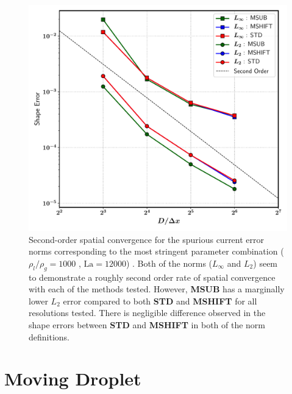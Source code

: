 \begin{figure}[h!]
    \centering
    \includegraphics[width = 1.0\textwidth]{plots/static_drop/convergence.pdf}
	\caption{Second-order spatial convergence for the spurious current error norms corresponding to the most stringent parameter combination ($\rho_l/\rho_g = 1000$ , $\textrm{La} = 12000$) . Both of the norms ($L_\infty$ and $L_2$) seem to demonstrate a roughly second order rate of spatial convergence with each of the methods tested. However, \textbf{MSUB} has a marginally lower $L_2$ error compared to both \textbf{STD} and \textbf{MSHIFT} for all resolutions tested. There is negligible difference observed in the shape errors between \textbf{STD} and \textbf{MSHIFT} in both of the norm definitions.}   
    \label{static_drop_conv}
\end{figure}



\section{Moving Droplet}

